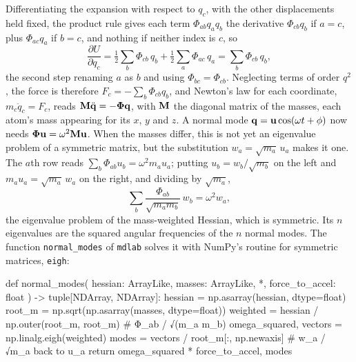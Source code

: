 Differentiating the expansion with respect to $q_c$, with the other
displacements held fixed, the product rule gives each term $\Phi_{ab}q_aq_b$
the derivative $\Phi_{cb}q_b$ if $a = c$, plus $\Phi_{ac}q_a$ if $b = c$,
and nothing if neither index is $c$, so
\begin{equation*}
   \frac{\partial U}{\partial q_c}
   = \tfrac12\sum_b \Phi_{cb}\,q_b + \tfrac12\sum_a \Phi_{ac}\,q_a
   = \sum_b \Phi_{cb}\,q_b ,
\end{equation*}
the second step renaming $a$ as $b$ and using $\Phi_{bc} = \Phi_{cb}$.
Neglecting terms of order $q^2$, the force is therefore $F_c = -\sum_b
\Phi_{cb}q_b$, and Newton's law for each coordinate, $m_c\ddot{q}_c = F_c$,
reads $\bm{\mathrm{M}}\ddot{\bm{\mathrm{q}}} = -\boldsymbol{\Phi}\bm{\mathrm{q}}$, with $\bm{\mathrm{M}}$ the
diagonal matrix of the masses, each atom's mass appearing for its $x$,
$y$ and $z$. A normal mode $\bm{\mathrm{q}} = \bm{\mathrm{u}}\cos(\omega t + \phi)$ now needs
$\boldsymbol{\Phi}\bm{\mathrm{u}} = \omega^2\bm{\mathrm{M}}\bm{\mathrm{u}}$. When the masses differ, this
is not yet an eigenvalue problem of a symmetric matrix, but the
substitution $w_a = \sqrt{m_a}\,u_a$ makes it one. The $a$th row reads
$\sum_b \Phi_{ab}u_b = \omega^2 m_a u_a$; putting $u_b = w_b/\sqrt{m_b}$
on the left and $m_au_a = \sqrt{m_a}\,w_a$ on the right, and dividing by
$\sqrt{m_a}$,
\begin{equation*}
   \sum_b \frac{\Phi_{ab}}{\sqrt{m_a m_b}}\,w_b = \omega^2 w_a ,
\end{equation*}
the eigenvalue problem of the mass-weighted Hessian, which is symmetric.
Its $n$ eigenvalues are the squared angular frequencies of the $n$ normal
modes. The function \texttt{normal\_modes} of \texttt{mdlab} solves it with
NumPy's routine for symmetric matrices, \texttt{eigh}:

\begin{code}
def normal_modes(
    hessian: ArrayLike, masses: ArrayLike, *, force_to_accel: float
) -> tuple[NDArray, NDArray]:
    hessian = np.asarray(hessian, dtype=float)
    root_m = np.sqrt(np.asarray(masses, dtype=float))
    weighted = hessian / np.outer(root_m, root_m)  # Φ_ab / √(m_a m_b)
    omega_squared, vectors = np.linalg.eigh(weighted)
    modes = vectors / root_m[:, np.newaxis]  # w_a / √m_a back to u_a
    return omega_squared * force_to_accel, modes
\end{code}

